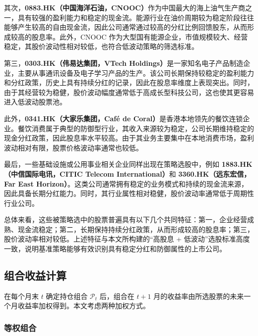 \documentclass[a4paper,10pt]{article}
\begin{document}
其次，\textbf{0883.HK（中国海洋石油，CNOOC）}作为中国最大的海上油气生产商之一，具有较强的盈利能力和稳定的现金流。能源行业在油价周期较为稳定阶段往往能够产生较高的自由现金流，因此公司通常通过较高的分红比例回馈股东，从而形成较高的股息率。此外，CNOOC 作为大型国有能源企业，市值规模较大、经营稳定，其股价波动性相对较低，也符合低波动策略的筛选标准。

第三，\textbf{0303.HK（伟易达集团，VTech Holdings）}是一家知名电子产品制造企业，主要从事通讯设备及电子学习产品的生产。该公司长期保持较稳定的盈利能力和分红政策，历史上具有持续分红的记录，因此在股息率维度上表现突出。同时，由于其经营较为稳健，股价波动幅度通常低于高成长型科技公司，这也使其更容易进入低波动股票池。

此外，\textbf{0341.HK（大家乐集团，Café de Coral）}是香港本地领先的餐饮连锁企业。餐饮消费属于典型的防御型行业，其收入来源较为稳定，公司长期维持稳定的现金分红政策，因此股息率水平较高。由于其业务主要集中在本地消费市场，盈利波动相对有限，股票价格波动率通常也较低。

最后，一些基础设施或公用事业相关企业同样出现在策略选股中，例如 \textbf{1883.HK（中信国际电讯，CITIC Telecom International）}和 \textbf{3360.HK（远东宏信，Far East Horizon）}。这类公司通常拥有稳定的业务模式和持续的现金流来源，因此具备长期分红能力。同时，其行业属性相对稳健，股价波动率通常低于周期性行业公司。

总体来看，这些被策略选中的股票普遍具有以下几个共同特征：第一，企业经营成熟、现金流稳定；第二，长期保持持续分红政策，从而形成较高的股息率；第三，股价波动率相对较低。上述特征与本文所构建的“高股息 + 低波动”选股标准高度一致，说明基准策略能够有效识别具有稳定分红和防御属性的上市公司。



















\subsection{组合收益计算}

在每个月末 $t$ 确定持仓组合 $\mathcal{P}_t$ 后，组合在 $t+1$ 月的收益率由所选股票的未来一个月收益率加权得到。本文考虑两种加权方式。

\subsubsection{等权组合}
\end{document}
